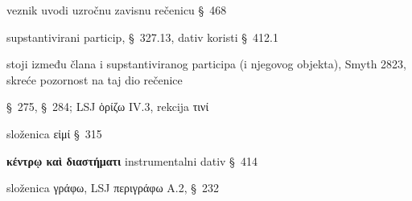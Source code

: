 \begin{description}[noitemsep]
\item[ἐπεὶ] veznik uvodi uzročnu zavisnu rečenicu §~468
\item[τοῖς\dots\ ἔχουσιν] supstantivirani particip, §~327.13, dativ koristi §~412.1
\item[γε] stoji između člana i supstantiviranog participa (i njegovog objekta), Smyth 2823, skreće pozornost na taj dio rečenice
\item[ὥρισται] §~275, §~284; LSJ ὁρίζω IV.3, rekcija τινί
\item[πάρεστι] složenica εἰμί §~315
\item[τῇ χρείᾳ\dots] \textbf{κέντρῳ καὶ διαστήματι} instrumentalni dativ §~414
\item[περιγραφόμενον] složenica γράφω, LSJ περιγράφω A.2, §~232

\end{description}




